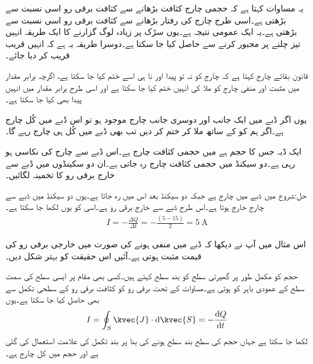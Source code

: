 یہ مساوات کہتا ہے کہ حجمی چارج کثافت بڑھانے سے کثافت برقی رو اسی نسبت سے بڑھتی ہے۔اسی طرح چارج کی رفتار بڑھانے سے کثافت برقی رو اسی نسبت سے بڑھتی ہے۔یہ ایک عمومی نتیجہ ہے۔یوں سڑک پر زیادہ لوگ گزارنے کا ایک طریقہ انہیں تیز چلنے پر مجبور کرنے سے حاصل کیا جا سکتا ہے۔دوسرا طریقہ یہ ہے کہ انہیں قریب قریب کر دیا جائے۔ 


قانون بقائے چارج کہتا ہے کہ چارج کو نہ تو پیدا  اور نا ہی اسے ختم کیا جا سکتا ہے، اگرچہ برابر مقدار میں مثبت اور منفی چارج کو ملا کی انہیں ختم کیا جا سکتا ہے اور اسی طرح برابر مقدار میں انہیں پیدا بھی کیا جا سکتا ہے۔

یوں اگر ڈبے میں ایک جانب  اور دوسری جانب  چارج موجود ہو تو اس ڈبے میں کُل  چارج ہے۔اگر ہم   کو   کے ساتھ ملا کر ختم کر دیں تب  بھی ڈبے میں کُل  ہی چارج رہے گا۔

ایک ڈبہ جس کا حجم  ہے میں حجمی کثافت چارج  ہے۔اس ڈبے سے چارج کی نکاسی ہو رہی ہے۔دو سیکنڈ میں حجمی کثافت چارج  رہ جاتی ہے۔ان دو سکینڈوں میں ڈبے سے خارج برقی رو کا تخمینہ لگائیں۔

حل:شروع میں ڈبے میں  چارج ہے جبکہ دو سیکنڈ بعد اس میں  رہ جاتا ہے۔یوں دو سیکنڈ میں ڈبے سے  چارج خارج ہوتا ہے۔اس طرح  ڈبے سے خارج برقی رو  ہے۔اسی کو یوں لکھا جا سکتا ہے۔
\begin{align*}
I=-\frac{\Delta Q}{\Delta t}=-\frac{(5-15)}{2}=\SI{5}{\ampere}
\end{align*}

اس مثال میں آپ نے دیکھا کہ ڈبے میں  منفی ہونے کی صورت میں خارجی برقی رو کی قیمت مثبت ہوتی ہے۔آئیں اس حقیقت کو بہتر شکل دیں۔

حجم کو مکمل طور پر گھیرتی سطح کو بند سطح کہتے ہیں۔کسی بھی مقام پر ایسی سطح کی سمت سطح کے عمودی باہر کو ہوتی ہے۔مساوات  کے تحت برقی رو کو کثافت برقی رو کے سطحی تکمل سے بھی حاصل کیا جا سکتا ہے۔یوں
\begin{align}\label{مساوات_کپیسٹر_استمراری_مساوات_تکمل_شکل}
I=\oint_S \kvec{J} \cdot \dif \kvec{S}=-\frac{\dif Q}{\dif t}
\end{align}
لکھا جا سکتا ہے جہاں حجم کی سطح بند سطح ہونے کی بنا پر بند تکمل کی علامت استعمال کی گئی ہے اور  حجم میں کل چارج ہے۔

